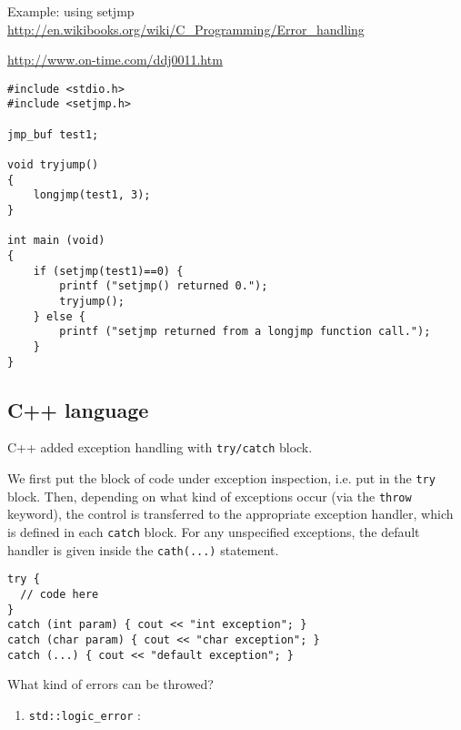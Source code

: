 Example: using setjmp
\url{http://en.wikibooks.org/wiki/C_Programming/Error_handling}

\url{http://www.on-time.com/ddj0011.htm}
\begin{Verbatim}
#include <stdio.h>
#include <setjmp.h>
 
jmp_buf test1;
 
void tryjump()
{
    longjmp(test1, 3);
}
 
int main (void)
{
    if (setjmp(test1)==0) {
        printf ("setjmp() returned 0.");
        tryjump();
    } else {
        printf ("setjmp returned from a longjmp function call.");
    }
}
\end{Verbatim}


\subsection{C++ language}

C++ added exception handling with \verb!try/catch! block.

We first put the block of code under exception inspection, i.e. put in the
\verb!try! block. Then, depending on what kind of exceptions occur (via the
\verb!throw! keyword), the control is transferred to the appropriate exception
handler, which is defined in each \verb!catch! block. For any unspecified
exceptions, the default handler is given inside the \verb!cath(...)! statement.

\begin{Verbatim}
try {
  // code here
}
catch (int param) { cout << "int exception"; }
catch (char param) { cout << "char exception"; }
catch (...) { cout << "default exception"; }
\end{Verbatim}


What kind of errors can be throwed?
\begin{enumerate}
  \item \verb!std::logic_error! : 
\end{enumerate}

